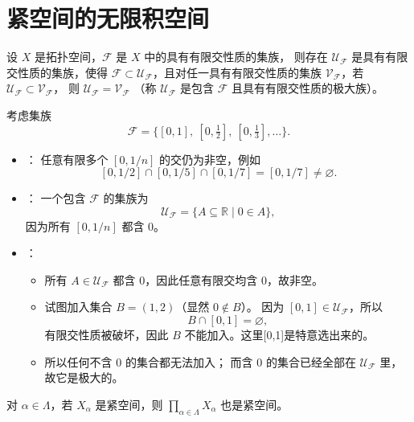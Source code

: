 \section{紧空间的无限积空间}
\begin{lemma}
设 $X$ 是拓扑空间，$\mathcal{F}$ 是 $X$ 中的具有有限交性质的集族，
则存在 $\mathcal{U}_{\mathcal{F}}$ 是具有有限交性质的集族，使得 
$\mathcal{F} \subset \mathcal{U}_{\mathcal{F}}$，且对任一具有有限交性质的集族 
$\mathcal{V}_{\mathcal{F}}$，若 $\mathcal{U}_{\mathcal{F}} \subset \mathcal{V}_{\mathcal{F}}$，
则 $\mathcal{U}_{\mathcal{F}} = \mathcal{V}_{\mathcal{F}}$
（称 $\mathcal{U}_{\mathcal{F}}$ 是包含 $\mathcal{F}$ 且具有有限交性质的极大族）。
\end{lemma}
\begin{example}

考虑集族
\[
\mathcal{F}=\{[0,1],\ [0,\tfrac12],\ [0,\tfrac13],\dots\}.
\]

\begin{itemize}
    \item[\color{purple}{(1)}] {\color{purple}{有限交性质}}：  
    任意有限多个 $[0,1/n]$ 的交仍为非空，例如
    \[
    [0,1/2]\cap[0,1/5]\cap[0,1/7]=[0,1/7]\neq\varnothing.
    \]

    \item[\color{purple}{(2)}] {\color{purple}{构造极大有限交族}}：  
    一个包含 $\mathcal{F}$ 的集族为
    \[
    \mathcal{U_F}=\{A\subseteq\mathbb{R}\mid 0\in A\},
    \]
    因为所有 $[0,1/n]$ 都含 $0$。

    \item[\color{purple}{(3)}] {\color{purple}{为什么它是极大？举具体例子说明不能再加入集合}}：
        \begin{itemize}
            \item 所有 $A\in\mathcal{U_F}$ 都含 $0$，因此任意有限交均含 $0$，故非空。
            \item 试图加入集合 $B=(1,2)$（显然 $0\notin B$）。  
            因为 $[0,1]\in\mathcal{U_F}$，所以
            \[
            B\cap[0,1]=\varnothing,
            \]
            有限交性质被破坏，因此 $B$ 不能加入。这里[0,1]是特意选出来的。
            \item 所以任何不含 $0$ 的集合都无法加入；  
            而含 $0$ 的集合已经全部在 $\mathcal{U_F}$ 里，故它是极大的。
        \end{itemize}
\end{itemize}

\end{example}
\begin{theorem}[任意多个紧空间的乘积仍然是紧的]
对 \(\alpha \in \Lambda\)，若 \(X_\alpha\) 是紧空间，则 \(\prod_{\alpha \in \Lambda} X_\alpha\) 也是紧空间。
\end{theorem}
